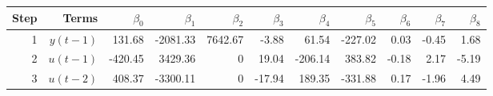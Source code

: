 \begin{tabular}{rrrrrrrrrrr}
Step & Terms & $\beta_{0}$ & $\beta_{1}$ & $\beta_{2}$ & $\beta_{3}$ & $\beta_{4}$ & $\beta_{5}$ & $\beta_{6}$ & $\beta_{7}$ & $\beta_{8}$ \\ 
\hline 
1 & $y(t-1)$ & 131.68 & -2081.33 & 7642.67 & -3.88 & 61.54 & -227.02 & 0.03 & -0.45 & 1.68 \\ 
2 & $u(t-1)$ & -420.45 & 3429.36 & 0 & 19.04 & -206.14 & 383.82 & -0.18 & 2.17 & -5.19 \\ 
3 & $u(t-2)$ & 408.37 & -3300.11 & 0 & -17.94 & 189.35 & -331.88 & 0.17 & -1.96 & 4.49 \\ 
\hline 
\end{tabular}